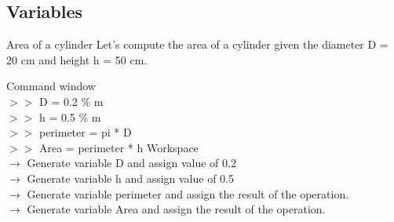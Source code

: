 \documentclass[xcolor={dvipsnames,rgb}, aspectratio=169]{beamer}
\begin{document}
\subsection{Variables}
\begin{frame}{Area of a cylinder}
    \large \textcolor{mylilas}{Let's compute the area of a cylinder given the diameter D = 20 cm
        and height h = 50 cm}.

    \begin{tcolorbox}[colback=white,colframe=bluepoli,sidebyside]
        \textcolor{mygreen}{Command window}\\
        $>>$ D = 0.2 \textcolor{codegreen}{ \% m} \\
        $>>$ h = 0.5 \textcolor{codegreen}{ \% m} \\
        $>>$ perimeter = pi * D\\
        $>>$ Area = perimeter * h
        \tcblower
        \textcolor{mygreen}{Workspace} \\
        \small $\rightarrow$ Generate variable D and assign value of 0.2\\
        $\rightarrow$ Generate variable h and assign value of 0.5\\
        $\rightarrow$ Generate variable perimeter and assign the result of the operation.\\
        $\rightarrow$ Generate variable Area and assign the result of the operation.\\
    \end{tcolorbox}
\end{frame}
\end{document}
